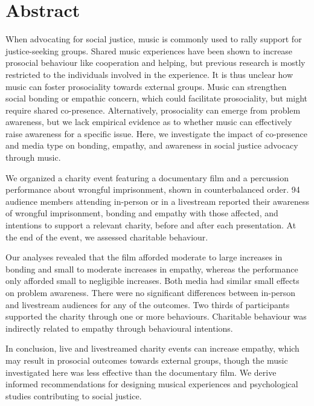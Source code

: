 \documentclass[
  man,floatsintext]{apa6}
\begin{document}
\newpage

\section*{Abstract}\label{abstract}

When advocating for social justice, music is commonly used to rally support for justice-seeking groups. Shared music experiences have been shown to increase prosocial behaviour like cooperation and helping, but previous research is mostly restricted to the individuals involved in the experience. It is thus unclear how music can foster prosociality towards external groups. Music can strengthen social bonding or empathic concern, which could facilitate prosociality, but might require shared co-presence. Alternatively, prosociality can emerge from problem awareness, but we lack empirical evidence as to whether music can effectively raise awareness for a specific issue. Here, we investigate the impact of co-presence and media type on bonding, empathy, and awareness in social justice advocacy through music.

We organized a charity event featuring a documentary film and a percussion performance about wrongful imprisonment, shown in counterbalanced order. 94 audience members attending in-person or in a livestream reported their awareness of wrongful imprisonment, bonding and empathy with those affected, and intentions to support a relevant charity, before and after each presentation. At the end of the event, we assessed charitable behaviour.

Our analyses revealed that the film afforded moderate to large increases in bonding and small to moderate increases in empathy, whereas the performance only afforded small to negligible increases. Both media had similar small effects on problem awareness. There were no significant differences between in-person and livestream audiences for any of the outcomes. Two thirds of participants supported the charity through one or more behaviours. Charitable behaviour was indirectly related to empathy through behavioural intentions.

In conclusion, live and livestreamed charity events can increase empathy, which may result in prosocial outcomes towards external groups, though the music investigated here was less effective than the documentary film. We derive informed recommendations for designing musical experiences and psychological studies contributing to social justice.

\newpage
\end{document}
